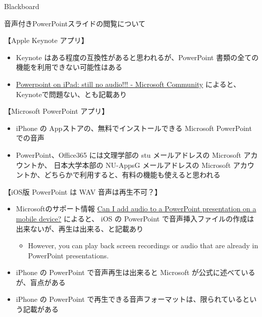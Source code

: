 \documentclass[a4j,10pt]{jsarticle}
\begin{document}
{\begin{frame}[label={sec:orgc119bb0},fragile]{Blackboard}
\begin{block}{音声付きPowerPointスライドの閲覧について}
\par
\begin{block}{【Apple Keynote アプリ】}
\begin{itemize}
\item Keynote はある程度の互換性があると思われるが、PowerPoint 書類の全ての機能を利用できない可能性はある
\item \href{https://answers.microsoft.com/en-us/msoffice/forum/all/powerpoint-on-ipad-still-no-audio/b9a77c5d-a744-4829-b28e-6fd409b21ad6}{Powerpoint on iPad: still no audio!!! - Microsoft Community} によると、Keynoteで問題ない、とも記載あり
\end{itemize}
\end{block}
\par
\begin{block}{【Microsoft PowerPoint アプリ】}
\begin{itemize}
\item iPhone の Appストアの、無料でインストールできる Microsoft PowerPoint での音声
\item PowerPoint、Office365 には文理学部の stu メールアドレスの Microsoft アカウントか、
日本大学本部の NU-AppsG メールアドレスの Microsoft アカウントか、どちらかで利用すると、有料の機能も使えると思われる
\end{itemize}
\end{block}
\par
\begin{block}{【iOS版 PowerPoint は WAV 音声は再生不可？】}
\begin{itemize}
\item Microsoftのサポート情報 \href{https://support.microsoft.com/en-gb/office/can-i-add-audio-to-a-powerpoint-presentation-on-a-mobile-device-76a88d09-96b2-465c-a0ad-036a24940d40\#:\~:text=On\%20iOS\%3A\%20No,are\%20already\%20in\%20PowerPoint\%20presentations.}{Can I add audio to a PowerPoint presentation on a mobile device?}
によると、 iOS の PowerPoint で音声挿入ファイルの作成は出来ないが、再生は出来る、と記載あり
\begin{itemize}
\item However, you can play back screen recordings or audio that are already in PowerPoint presentations.
\end{itemize}
\item iPhone の PowerPoint で音声再生は出来ると Microsoft が公式に述べているが、盲点がある
\item iPhone の PowerPoint で再生できる音声フォーマットは、限られているという記載がある
\begin{itemize}

\end{itemize}
\end{itemize}
\end{block}
\end{block}
\end{frame}}
\end{document}
